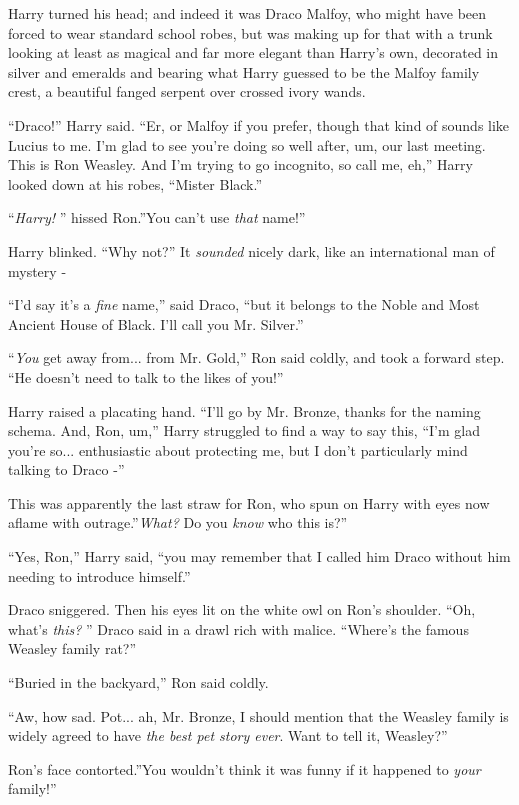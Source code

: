 Harry turned his head; and indeed it was Draco Malfoy, who might have
been forced to wear standard school robes, but was making up for that
with a trunk looking at least as magical and far more elegant than
Harry's own, decorated in silver and emeralds and bearing what Harry
guessed to be the Malfoy family crest, a beautiful fanged serpent over
crossed ivory wands.

``Draco!'' Harry said. ``Er, or Malfoy if you prefer, though that kind
of sounds like Lucius to me. I'm glad to see you're doing so well after,
um, our last meeting. This is Ron Weasley. And I'm trying to go
incognito, so call me, eh,'' Harry looked down at his robes, ``Mister
Black.''

``\emph{Harry!} '' hissed Ron.''You can't use \emph{that} name!''

Harry blinked. ``Why not?'' It \emph{sounded} nicely dark, like an
international man of mystery -

``I'd say it's a \emph{fine} name,'' said Draco, ``but it belongs to the
Noble and Most Ancient House of Black. I'll call you Mr. Silver.''

``\emph{You} get away from... from Mr. Gold,'' Ron said coldly, and
took a forward step. ``He doesn't need to talk to the likes of you!''

Harry raised a placating hand. ``I'll go by Mr. Bronze, thanks for the
naming schema. And, Ron, um,'' Harry struggled to find a way to say
this, ``I'm glad you're so... enthusiastic about protecting me, but
I don't particularly mind talking to Draco -''

This was apparently the last straw for Ron, who spun on Harry with eyes
now aflame with outrage.''\emph{What?} Do you \emph{know} who this is?''

``Yes, Ron,'' Harry said, ``you may remember that I called him Draco
without him needing to introduce himself.''

Draco sniggered. Then his eyes lit on the white owl on Ron's shoulder.
``Oh, what's \emph{this?} '' Draco said in a drawl rich with malice.
``Where's the famous Weasley family rat?''

``Buried in the backyard,'' Ron said coldly.

``Aw, how sad. Pot... ah, Mr. Bronze, I should mention that the
Weasley family is widely agreed to have \emph{the best pet story ever}.
Want to tell it, Weasley?''

Ron's face contorted.''You wouldn't think it was funny if it happened to
\emph{your} family!''


